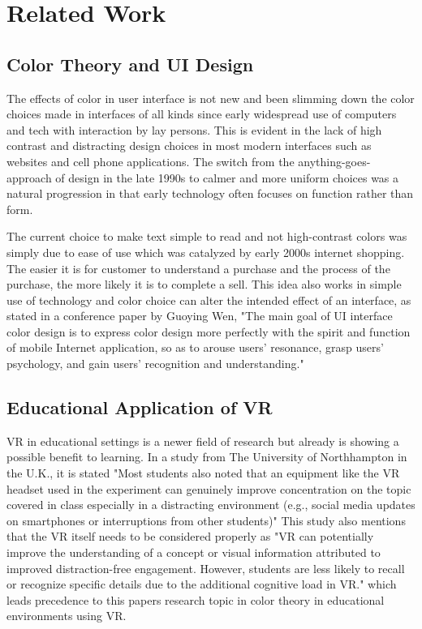 \documentclass[acmlarge]{acmart}
\begin{document}
\section{Related Work}

\subsection{Color Theory and UI Design}
The effects of color in user interface is not new and been slimming down the color choices made in interfaces of all kinds since early widespread use of computers and 
tech with interaction by lay persons. This is evident in the lack of high contrast and distracting design choices in most modern interfaces such as websites and cell phone applications.
The switch from the anything-goes-approach of design in the late 1990s to calmer and more uniform choices was a natural progression in that early technology often focuses on function rather
than form. 

The current choice to make text simple to read and not high-contrast colors was simply due to ease of use which was catalyzed by early 2000s internet shopping. The easier it is for
customer to understand a purchase and the process of the purchase, the more likely it is to complete a sell. This idea also works in simple use of technology and color choice can
alter the intended effect of an interface, as stated in a conference paper by Guoying Wen, "The main goal of UI interface color design is to express color design more perfectly with the spirit and function of mobile Internet 
application, so as to arouse users' resonance, grasp users' psychology, and gain users' recognition and understanding." \cite{wen2021color}

\subsection{Educational Application of VR}
VR in educational settings is a newer field of research but already is showing a possible benefit to learning. In a study from  The University of Northhampton in the U.K.,
it is stated "Most students also noted that an equipment like the VR headset used in the experiment can genuinely improve concentration on the topic covered in class especially in a distracting environment
(e.g., social media updates on smartphones or interruptions from other students)" \cite{slavova2018comparative} This study also mentions that the VR itself 
needs to be considered properly as "VR can potentially improve the understanding of a concept or visual information attributed to improved distraction-free engagement. However, students are less likely 
to recall or recognize specific details due to the additional cognitive load in VR." \cite{slavova2018comparative} which leads precedence to this papers research topic in color theory
in educational environments using VR.
\end{document}
